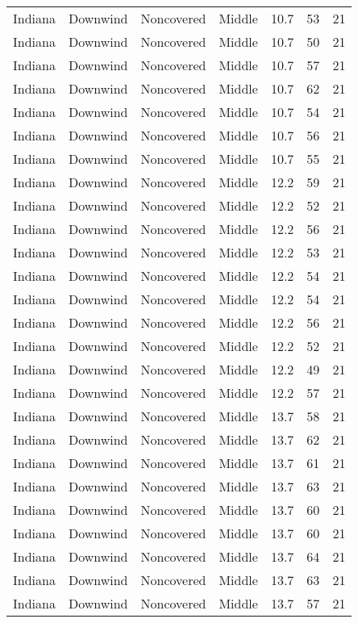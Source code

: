 \documentclass{article}
\begin{document}
\begin{longtable}[H]{ccccccc}
Indiana & Downwind & Noncovered & Middle & 10.7 & 53 & 21 \\
Indiana & Downwind & Noncovered & Middle & 10.7 & 50 & 21 \\
Indiana & Downwind & Noncovered & Middle & 10.7 & 57 & 21 \\
Indiana & Downwind & Noncovered & Middle & 10.7 & 62 & 21 \\
Indiana & Downwind & Noncovered & Middle & 10.7 & 54 & 21 \\
Indiana & Downwind & Noncovered & Middle & 10.7 & 56 & 21 \\
Indiana & Downwind & Noncovered & Middle & 10.7 & 55 & 21 \\
Indiana & Downwind & Noncovered & Middle & 12.2 & 59 & 21 \\
Indiana & Downwind & Noncovered & Middle & 12.2 & 52 & 21 \\
Indiana & Downwind & Noncovered & Middle & 12.2 & 56 & 21 \\
Indiana & Downwind & Noncovered & Middle & 12.2 & 53 & 21 \\
Indiana & Downwind & Noncovered & Middle & 12.2 & 54 & 21 \\
Indiana & Downwind & Noncovered & Middle & 12.2 & 54 & 21 \\
Indiana & Downwind & Noncovered & Middle & 12.2 & 56 & 21 \\
Indiana & Downwind & Noncovered & Middle & 12.2 & 52 & 21 \\
Indiana & Downwind & Noncovered & Middle & 12.2 & 49 & 21 \\
Indiana & Downwind & Noncovered & Middle & 12.2 & 57 & 21 \\
Indiana & Downwind & Noncovered & Middle & 13.7 & 58 & 21 \\
Indiana & Downwind & Noncovered & Middle & 13.7 & 62 & 21 \\
Indiana & Downwind & Noncovered & Middle & 13.7 & 61 & 21 \\
Indiana & Downwind & Noncovered & Middle & 13.7 & 63 & 21 \\
Indiana & Downwind & Noncovered & Middle & 13.7 & 60 & 21 \\
Indiana & Downwind & Noncovered & Middle & 13.7 & 60 & 21 \\
Indiana & Downwind & Noncovered & Middle & 13.7 & 64 & 21 \\
Indiana & Downwind & Noncovered & Middle & 13.7 & 63 & 21 \\
Indiana & Downwind & Noncovered & Middle & 13.7 & 57 & 21 \\

\end{longtable}
\end{document}

